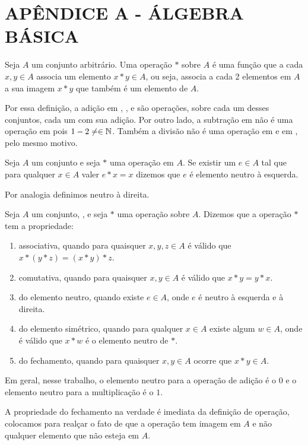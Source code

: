 \documentclass[../main.tex]{subfiles}
\begin{document}
\chapter*[Apêndice]{APÊNDICE A - ÁLGEBRA BÁSICA}

\begin{defi}
    Seja $A$ um conjunto arbitrário. Uma operação $*$ sobre $A$ é uma função que a cada $x,y \in A$ associa um elemento $x * y \in A$, ou seja, associa a cada 2 elementos em $A$ a sua imagem $x * y$ que também é um elemento de $A$.
\end{defi}
Por essa definição, a adição em \N, \Z, \Q e \R são operações, sobre cada um desses conjuntos, cada um com sua adição. Por outro lado, a subtração em \N não é uma operação em \N pois $1-2 \neq \in \mathbb{N}$. Também a divisão não é uma operação em \N e em \Z, pelo mesmo motivo.

\begin{defi}
    Seja $A$ um conjunto e seja $*$ uma operação em $A$. Se existir um $e \in A$ tal que para qualquer $x \in A$ valer $e * x = x$ dizemos que $e$ é elemento neutro à esquerda.
\end{defi}
Por analogia definimos neutro à direita.

\begin{defi}
    Seja $A$ um conjunto, , e seja $*$ uma operação sobre $A$. Dizemos que a operação $*$ tem a propriedade:
    \begin{enumerate}[label=(\roman*)]
        \item associativa, quando para quaisquer $x,y,z \in A$ é válido que $ x * ( y * z ) = ( x * y ) * z$.
        \item comutativa, quando para quaisquer $x,y \in A$ é válido que $x * y = y * x$.
        \item do elemento neutro, quando existe $e \in A$, onde $e$ é neutro à esquerda e à direita.
        \item do elemento simétrico, quando para qualquer $x \in A$ existe algum $w \in A$, onde é válido que $x * w$ é o elemento neutro de $*$.
        \item do fechamento, quando para quaisquer $x, y \in A$ ocorre que $x * y \in A$.
    \end{enumerate}
\end{defi}
Em geral, nesse trabalho, o elemento neutro para a operação de adição é o $0$ e o elemento neutro para a multiplicação é o $1$. 
\begin{obs}
    A propriedade do fechamento na verdade é imediata da definição de operação, colocamos para realçar o fato de que a operação tem imagem em $A$ e não qualquer elemento que não esteja em $A$.
\end{obs}
\end{document}
